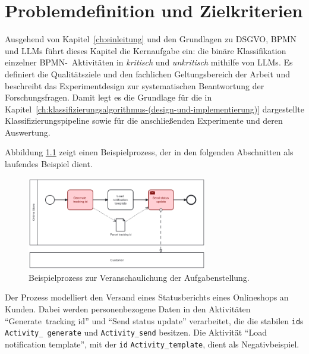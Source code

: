 \chapter{Problemdefinition und Zielkriterien}\label{ch:problemdefinition-und-zielkriterien}

Ausgehend von Kapitel~\ref{ch:einleitung} und den Grundlagen zu \ac{DSGVO}, \ac{BPMN} und \acp{LLM} führt dieses Kapitel die Kernaufgabe ein: die binäre Klassifikation einzelner \ac{BPMN}-\linebreak~Aktivitäten in \emph{kritisch} und \emph{unkritisch} mithilfe von \acp{LLM}. Es definiert die Qualitätsziele und den fachlichen Geltungsbereich der Arbeit und beschreibt das Experimentdesign zur systematischen Beantwortung der Forschungsfragen. Damit legt es die Grundlage für die in Kapitel~\ref{ch:klassifizierungsalgorithmus-(design-und-implementierung)} dargestellte Klassifizierungspipeline sowie für die anschließenden Experimente und deren Auswertung.

Abbildung \ref{fig:running_example} zeigt einen Beispielprozess, der in den folgenden Abschnitten als laufendes Beispiel dient.

\begin{figure}[h]
    \centering
    \includegraphics[width=0.7\textwidth]{images/running_example_en}
    \caption{Beispielprozess zur Veranschaulichung der Aufgabenstellung.}
    \label{fig:running_example}
\end{figure}

Der Prozess modelliert den Versand eines Statusberichts eines Onlineshops an Kunden. Dabei werden personenbezogene Daten in den Aktivitäten \enquote{Generate\linebreak~tracking id} und \enquote{Send status update} verarbeitet, die die stabilen \texttt{id}s \texttt{Activity\_\linebreak~generate} und \texttt{Activity\_send} besitzen. Die Aktivität \enquote{Load notification template}, mit der \texttt{id} \texttt{Activity\_template}, dient als Negativbeispiel.





